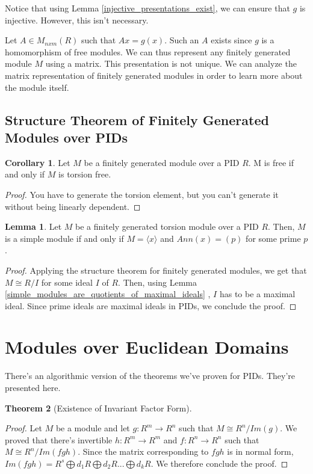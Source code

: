 \documentclass{article}
\theoremstyle{definition}
\newtheorem{theorem}{Theorem}[section]
\newtheorem{lemma}[theorem]{Lemma}
\newtheorem{corollary}{Corollary}[theorem]
\begin{document}
Notice that using Lemma \ref{injective_presentations_exist}, we can ensure that $g$ is injective.
However, this isn't necessary.

Let $A \in M_{nxm}(R)$ such that $Ax = g(x)$. Such an $A$ exists since $g$ is 
a homomorphism of free modules. We can thus represent any finitely generated module $M$
using a matrix. This presentation is not unique. We can analyze the matrix representation of finitely
generated modules in order to learn more about the module itself.

\subsection{Structure Theorem of Finitely Generated Modules over PIDs}

\begin{corollary}
    Let $M$ be a finitely generated module over a PID $R$. M is free if and only if
    $M$ is torsion free.
\end{corollary}
\begin{proof}
    You have to generate the torsion element, but you can't generate it without being
    linearly dependent.
\end{proof}

\begin{lemma}
    Let $M$ be a finitely generated torsion module over a PID $R$.
    Then, $M$ is a simple module if and only if $M = \langle x \rangle$ and $Ann(x) = (p)$
    for some prime $p$.
\end{lemma}
\begin{proof}
    Applying the structure theorem for finitely generated modules, we get that
    $M \cong R/I$ for some ideal $I$ of $R$. Then, using Lemma 
    \ref{simple_modules_are_quotients_of_maximal_ideals}
    , $I$ has to be a maximal ideal. Since prime ideals are maximal ideals in PIDs, we conclude the proof.
\end{proof}

\newpage

\section{Modules over Euclidean Domains}

There's an algorithmic version of the theorems we've proven for PIDs. They're presented here.

\begin{theorem}[Existence of Invariant Factor Form]
    
\end{theorem}
\begin{proof}
    Let $M$ be a module and let $g: R^{m} \xrightarrow{} R^{n}$ such that $M \cong R^{n}/Im(g)$. We proved that there's invertible $h: R^{m} \xrightarrow{} R^{m}$ and $f: R^{n} \xrightarrow{} R^{n}$ such that $M \cong R^{n}/Im(fgh)$. Since the matrix corresponding to $fgh$ is in normal form, $Im(fgh) = R^{s} \bigoplus d_{1}R \bigoplus d_{2}R ... \bigoplus d_{k}R$. We therefore conclude the proof.
\end{proof}
\end{document}

